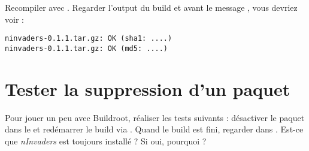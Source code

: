 Recompiler avec .
Regarder l'output du build et avant le message ,
vous devriez voir :

\begin{verbatim}
ninvaders-0.1.1.tar.gz: OK (sha1: ....)
ninvaders-0.1.1.tar.gz: OK (md5: ....)
\end{verbatim}

\section{Tester la suppression d'un paquet}

Pour jouer un peu avec Buildroot, réaliser les tests suivants : désactiver
le paquet  dans le  et redémarrer le build via
. Quand le build est fini, regarder dans .
Est-ce que {\em nInvaders} est toujours installé ? Si oui, pourquoi ?
